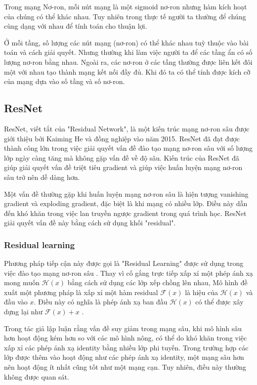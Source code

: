 Trong mạng Nơ-ron, mỗi nút mạng là một sigmoid nơ-ron nhưng hàm kích hoạt của chúng có thể khác nhau. Tuy nhiên trong thực tế người ta thường để chúng cùng dạng với nhau để tính toán cho thuận lợi.

Ở mỗi tầng, số lượng các nút mạng (nơ-ron) có thể khác nhau tuỳ thuộc vào bài toán và cách giải quyết. Nhưng thường khi làm việc người ta để các tầng ẩn có số lượng nơ-ron bằng nhau. Ngoài ra, các nơ-ron ở các tầng thường được liên kết đôi một với nhau tạo thành mạng kết nối đầy đủ. Khi đó ta có thể tính được kích cỡ của mạng dựa vào số tầng và số nơ-ron.

\subsection{ResNet}
ResNet, viết tắt của "Residual Network", là một kiến trúc mạng nơ-ron sâu được giới thiệu bởi Kaiming He và đồng nghiệp vào năm 2015. ResNet đã đạt được thành công lớn trong việc giải quyết vấn đề đào tạo mạng nơ-ron sâu với số lượng lớp ngày càng tăng mà không gặp vấn đề về độ sâu. Kiến trúc của ResNet đã giúp giải quyết vấn đề triệt tiêu gradient và giúp việc huấn luyện mạng nơ-ron sâu trở nên dễ dàng hơn.

Một vấn đề thường gặp khi huấn luyện mạng nơ-ron sâu là hiện tượng vanishing gradient và exploding gradient, đặc biệt là khi mạng có nhiều lớp. Điều này dẫn đến khó khăn trong việc lan truyền ngược gradient trong quá trình học. ResNet giải quyết vấn đề này bằng cách sử dụng khối "residual".

\subsubsection*{Residual learning}
Phương pháp tiếp cận này được gọi là "Residual Learning" được sử dụng trong việc đào tạo mạng nơ-ron sâu . Thay vì cố gắng trực tiếp xấp xỉ một phép ánh xạ mong muốn $\mathcal{H}(x)$ bằng cách sử dụng các lớp xếp chồng lên nhau, Mô hình đề xuất một phương pháp là xấp xỉ một hàm residual $\mathcal{F}(x)$ là hiệu của $\mathcal{H}(x)$ và đầu vào $x$. Điều này có nghĩa là phép ánh xạ ban đầu $\mathcal{H}(x)$ có thể được xây dựng lại như $\mathcal{F}(x) + x$ \cite{he2015deep}.

Trong \cite{he2015deep} tác giả lập luận rằng vấn đề suy giảm trong mạng sâu, khi mô hình sâu hơn hoạt động kém hơn so với các mô hình nông, có thể do khó khăn trong việc xấp xỉ các phép ánh xạ identity bằng nhiều lớp phi tuyến. Trong trường hợp các lớp được thêm vào hoạt động như các phép ánh xạ identity, một mạng sâu hơn nên hoạt động ít nhất cũng tốt như một mạng cạn. Tuy nhiên, điều này thường không được quan sát.

